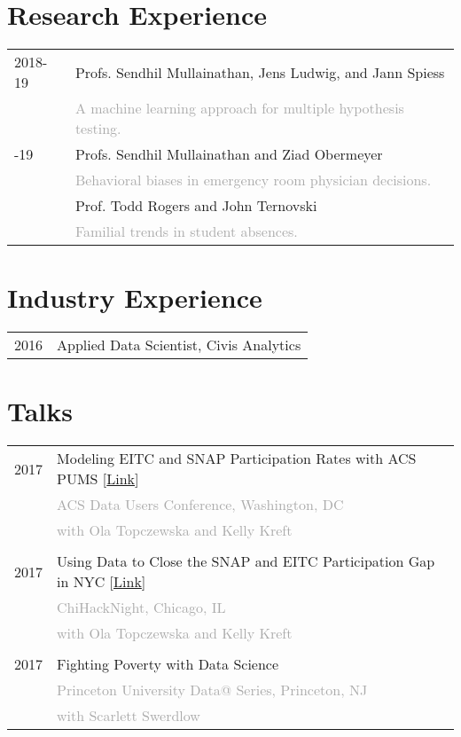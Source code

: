 \documentclass[12pt]{article}
\begin{document}


\section*{Research Experience}
\label{sec:research_experience}
\begin{tabular}{p{\datecolumn} l}
2018-19 & Profs. Sendhil Mullainathan, Jens Ludwig, and Jann Spiess \\
        & \textcolor{darkgrey}{A machine learning approach for multiple hypothesis testing.} \\
\shortrow
2018-19 & Profs. Sendhil Mullainathan and Ziad Obermeyer \\
        & \textcolor{darkgrey}{Behavioral biases in emergency room physician decisions.} \\
\shortrow
2015    & Prof. Todd Rogers and John Ternovski \\
        & \textcolor{darkgrey}{Familial trends in student absences.} \\
\end{tabular}

\section*{Industry Experience}
\label{sec:industry_experience}
\begin{tabular}{p{\datecolumn} l}
2016\textendash18 & Applied Data Scientist, Civis Analytics
\end{tabular}

\section*{Talks}
\label{sec:talks}
\begin{tabular}{p{\datecolumn} l}
2017 & Modeling EITC and SNAP Participation Rates with ACS PUMS
[\href{http://www.ebmcdn.net/prb/iframe-video-viewer.php?viewnode=acs-may17/acs-051117-south-6}{Link}] \\
& \textcolor{darkgrey}{ACS Data Users Conference, Washington, DC} \\
& \textcolor{darkgrey}{with Ola Topczewska and Kelly Kreft} \\
& \\[-1.5ex]
2017 & Using Data to Close the SNAP and EITC Participation Gap in NYC
[\href{https://www.youtube.com/watch?v=XSQOCXwNqUA6}{Link}] \\
& \textcolor{darkgrey}{ChiHackNight, Chicago, IL} \\
& \textcolor{darkgrey}{with Ola Topczewska and Kelly Kreft} \\
& \\[-1.5ex]
2017 & Fighting Poverty with Data Science \\
& \textcolor{darkgrey}{Princeton University Data@ Series, Princeton, NJ} \\
& \textcolor{darkgrey}{with Scarlett Swerdlow} \\
\end{tabular}
\end{document}
